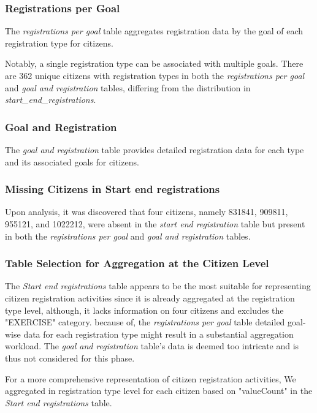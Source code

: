 \documentclass[12pt]{article}
\begin{document}
\subsubsection{Registrations per Goal}
The \textit{registrations per goal} table aggregates registration data by the goal of each registration type for citizens. 

Notably, a single registration type can be associated with multiple goals. There are 362 unique citizens with registration types in both the \textit{registrations per goal} and \textit{goal and registration} tables, differing from the distribution in \textit{start\_end\_registrations}.

\subsubsection{Goal and Registration}
The \textit{goal and registration} table provides detailed registration data for each type and its associated goals for citizens.

\subsubsection{Missing Citizens in Start end registrations}
Upon analysis, it was discovered that four citizens, namely 831841, 909811, 955121, and 1022212, were absent in the \textit{start end registration} table but present in both the \textit{registrations per goal} and \textit{goal and registration} tables.

\subsubsection{Table Selection for Aggregation at the Citizen Level}
The \textit{Start end registrations} table appears to be the most suitable for representing citizen registration activities since it is already aggregated at the registration type level, although, it lacks information on four citizens and excludes the "EXERCISE" category. because of, the \textit{registrations per goal} table detailed goal-wise data for each registration type might result in a substantial aggregation workload. The \textit{goal and registration} table's data is deemed too intricate and is thus not considered for this phase.

For a more comprehensive representation of citizen registration activities, 
We aggregated in registration type level for each citizen based on "valueCount"  
in the \textit{Start end registrations} table.
\end{document}
